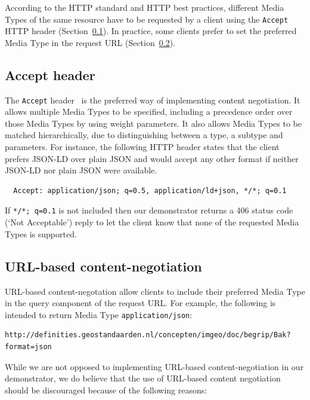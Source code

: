 \documentclass[a4paper]{scrartcl}
\newcommand{\textt}[1]{{\small \texttt{#1}}}
\begin{document}
According to the HTTP standard and HTTP best practices, different
Media Types of the same resource have to be requested by a client
using the \textt{Accept} HTTP header
(Section~\ref{sec:accept_header}).  In practice, some clients prefer
to set the preferred Media Type in the request URL
(Section~\ref{sec:url_based_content_negotiation}).


\subsection{Accept header}
\label{sec:accept_header}

The \textt{Accept} header~\cite{RFC7231} is the preferred way of
implementing content negotiation.  It allows multiple Media Types to
be specified, including a precedence order over those Media Types by
using weight parameters.  It also allows Media Types to be matched
hierarchically, due to distinguishing between a type, a subtype and
parameters.  For instance, the following HTTP header states that the
client prefers JSON-LD over plain JSON and would accept any other
format if neither JSON-LD nor plain JSON were available.

\begin{verbatim}
  Accept: application/json; q=0.5, application/ld+json, */*; q=0.1
\end{verbatim}

If \textt{*/*; q=0.1} is not included then our demonstrator returns a
406 status code (`Not Acceptable') reply to let the client know that
none of the requested Media Types is supported.


\subsection{URL-based content-negotiation}
\label{sec:url_based_content_negotiation}

URL-based content-negotation allow clients to include their preferred
Media Type in the query component of the request URL.  For example,
the following is intended to return Media Type
\textt{application/json}:

\begin{verbatim}
http://definities.geostandaarden.nl/concepten/imgeo/doc/begrip/Bak?format=json
\end{verbatim}

While we are not opposed to implementing URL-based content-negotiation in
our demonstrator, we do believe that the use of URL-based content
negotiation should be discouraged because of the following reasons:
\end{document}
